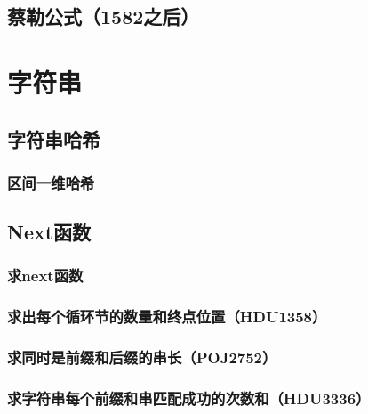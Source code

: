 \documentclass[landscape,twocolumn,twoside,a4paper]{article}
\begin{document}
\subsection{蔡勒公式（1582之后）}


\section{字符串}

\subsection{字符串哈希}
\subsubsection{区间一维哈希}

% 



\subsection{Next函数}

\subsubsection{求next函数}


\subsubsection{求出每个循环节的数量和终点位置（HDU1358）}


\subsubsection{求同时是前缀和后缀的串长（POJ2752）}


\subsubsection{求字符串每个前缀和串匹配成功的次数和（HDU3336）}

\end{document}
